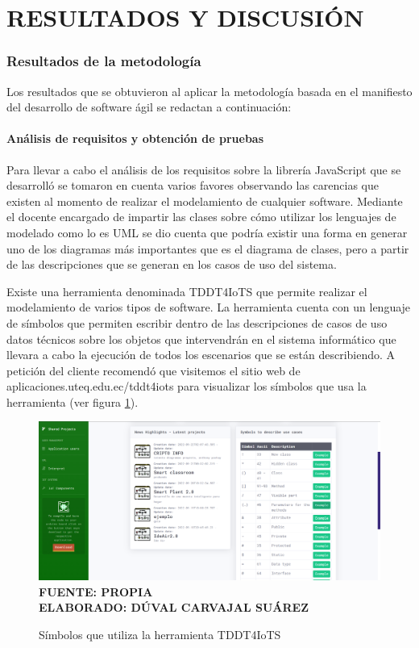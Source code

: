 \setcounter{chapter}{4}
\setcounter{section}{0}
\part{RESULTADOS Y DISCUSIÓN} 

\section{Resultados de la metodología}

Los resultados que se obtuvieron al aplicar la metodología basada en el manifiesto del desarrollo de software ágil se redactan a continuación:

\subsection{Análisis de requisitos y obtención de pruebas}

Para llevar a cabo el análisis de los requisitos sobre la librería JavaScript que se desarrolló se tomaron en cuenta varios favores observando las carencias que existen al momento de realizar el modelamiento de cualquier software. Mediante el docente encargado de impartir las clases sobre cómo utilizar los lenguajes de modelado como lo es UML se dio cuenta que podría existir una forma en generar uno de los diagramas más importantes que es el diagrama de clases, pero a partir de las descripciones que se generan en los casos de uso del sistema.

Existe una herramienta denominada TDDT4IoTS que permite realizar el modelamiento de varios tipos de software. La herramienta cuenta con un lenguaje de símbolos que permiten escribir dentro de las descripciones de casos de uso datos técnicos sobre los objetos que intervendrán en el sistema informático que llevara a cabo la ejecución de todos los escenarios que se están describiendo. A petición del cliente recomendó que visitemos el sitio web de aplicaciones.uteq.edu.ec/tddt4iots para visualizar  los símbolos que usa la herramienta (ver figura \ref{fig:simbolostdd}).

\begin{figure}[H]
	\caption{Símbolos que utiliza la herramienta TDDT4IoTS}
	\includegraphics[width=14cm]{img/res_001.png}
	\label{fig:simbolostdd}
	\textbf{\\ FUENTE: PROPIA \\ ELABORADO: DÚVAL CARVAJAL SUÁREZ}
\end{figure}

